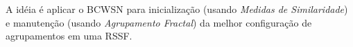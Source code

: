 \documentclass{acm_proc_article-sp}
\begin{document}


A idéia é aplicar o BCWSN para inicialização (usando {\it Medidas de
Similaridade}) e manutenção (usando {\it Agrupamento Fractal}) da melhor
configuração de agrupamentos em uma RSSF.
\vspace*{-.3cm}

\end{document}
